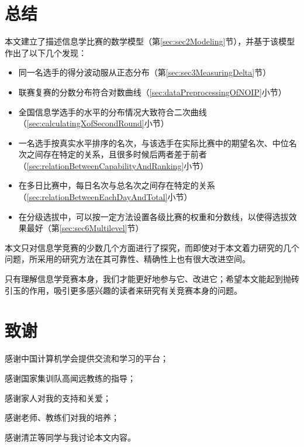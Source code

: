 \newpage

\section{总结}

    本文建立了描述信息学比赛的数学模型（第\ref{sec:sec2Modeling}节），并基于该模型作出了以下几个发现：
    \begin{itemize}[leftmargin=4em]
        \item 同一名选手的得分波动服从正态分布（第\ref{sec:sec3MeasuringDelta}节）
        \item 联赛复赛的分数分布符合对数曲线（\ref{sec:dataPreprocessingOfNOIP}小节）
        \item 全国信息学选手的水平的分布情况大致符合二次曲线（\ref{sec:calculatingXofSecondRound}小节）
        \item 一名选手按真实水平排序的名次，与该选手在实际比赛中的期望名次、中位名次之间存在特定的关系，且很多时候后两者差于前者（\ref{sec:relationBetweenCapabilityAndRanking}小节）
        \item 在多日比赛中，每日名次与总名次之间存在特定的关系（\ref{sec:relationBetweenEachDayAndTotal}小节）
        \item 在分级选拔中，可以按一定方法设置各级比赛的权重和分数线，以使得选拔效果最好（第\ref{sec:sec6Multilevel}节）
    \end{itemize}

    \vspace{1.5ex}
    
    本文只对信息学竞赛的少数几个方面进行了探究，而即使对于本文着力研究的几个问题，所采用的研究方法在其可靠性、精确性上也有很大改进空间。
    
    只有理解信息学竞赛本身，我们才能更好地参与它、改进它；希望本文能起到抛砖引玉的作用，吸引更多感兴趣的读者来研究有关竞赛本身的问题。

\section{致谢}

    感谢中国计算机学会提供交流和学习的平台；

    感谢国家集训队高闻远教练的指导；

    感谢家人对我的支持和关爱；

    感谢老师、教练们对我的培养；

    感谢清芷等同学与我讨论本文内容。

